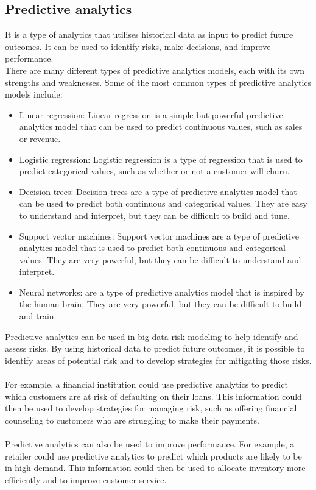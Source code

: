 \subsection{Predictive analytics}
It is a type of analytics that utilises historical data as input to predict future outcomes. It can 
be used to identify risks, make decisions, and improve performance.\\
There are many different types of predictive analytics models, each with its own strengths and weaknesses. 
Some of the most common types of predictive analytics models include:
\begin{itemize}
    \item Linear regression: Linear regression is a simple but powerful predictive analytics model that can be used to 
predict continuous values, such as sales or revenue.

\item Logistic regression: Logistic regression is a type of regression that is used to predict categorical values, such 
as whether or not a customer will churn.

\item Decision trees: Decision trees are a type of predictive analytics model that can be used to predict both continuous 
and categorical values. They are easy to understand and interpret, but they can be difficult to build and tune.

\item Support vector machines: Support vector machines are a type of predictive analytics model that is used to predict 
both continuous and categorical values. They are very powerful, but they can be difficult to understand and 
interpret.

\item Neural networks: are a type of predictive analytics model that is inspired by the human brain. They 
are very powerful, but they can be difficult to build and train.\\
\end{itemize}
Predictive analytics can be used in big data risk modeling to help identify and assess risks. By using historical 
data to predict future outcomes, it is possible to identify areas of potential risk and to develop strategies for 
mitigating those risks.\\\\
For example, a financial institution could use predictive analytics to predict which customers are at risk of 
defaulting on their loans. This information could then be used to develop strategies for managing risk, such as 
offering financial counseling to customers who are struggling to make their payments.\\\\
Predictive analytics can also be used to improve performance. For example, a retailer could use predictive analytics 
to predict which products are likely to be in high demand. This information could then be used to allocate inventory 
more efficiently and to improve customer service.

